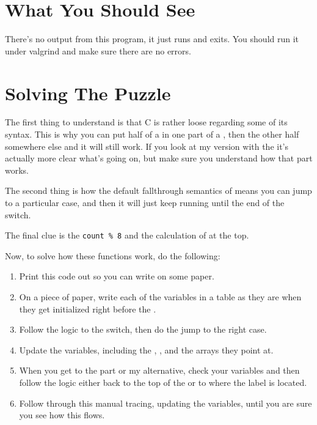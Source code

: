 \section{What You Should See}

There's no output from this program, it just runs and exits.  You should
run it under valgrind and make sure there are no errors.

\section{Solving The Puzzle}

The first thing to understand is that C is rather loose regarding some
of its syntax.  This is why you can put half of a  in
one part of a , then the other half somewhere
else and it will still work.  If you look at my version with the 
it's actually more clear what's going on, but make sure you understand
how that part works.

The second thing is how the default fallthrough semantics of
 means you can jump to a particular case, and
then it will just keep running until the end of the switch.

The final clue is the \verb|count % 8| and the calculation of  at
the top.

Now, to solve how these functions work, do the following:

\begin{enumerate}
\item Print this code out so you can write on some paper.
\item On a piece of paper, write each of the variables in a table as they
    are when they get initialized right before the .
\item Follow the logic to the switch, then do the jump to the right case.
\item Update the variables, including the , , and the
    arrays they point at.
\item When you get to the  part or my  alternative,
    check your variables and then follow the logic either back to the
    top of the  or to where the  label is 
    located.
\item Follow through this manual tracing, updating the variables, until
    you are sure you see how this flows.
\end{enumerate}

